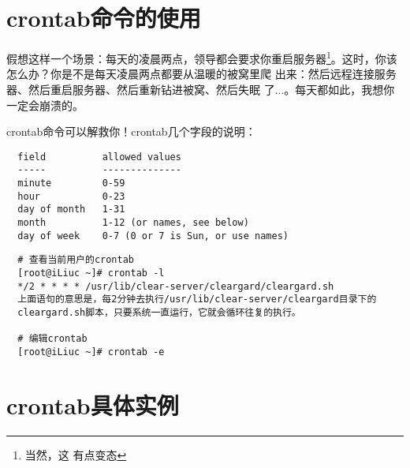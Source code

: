 \section{crontab命令的使用}
\label{sec:crontabCmd}

假想这样一个场景：每天的凌晨两点，领导都会要求你重启服务器\footnote{当然，这
有点变态}。这时，你该怎么办？你是不是每天凌晨两点都要从温暖的被窝里爬
出来：然后远程连接服务器、然后重启服务器、然后重新钻进被窝、然后失眠
了...。每天都如此，我想你一定会崩溃的。

crontab命令可以解救你！crontab几个字段的说明：

\small{
\begin{verbatim}
  field          allowed values
  -----          --------------
  minute         0-59
  hour           0-23
  day of month   1-31
  month          1-12 (or names, see below)
  day of week    0-7 (0 or 7 is Sun, or use names)
\end{verbatim}
}
\normalsize

\small{
\begin{verbatim}
  # 查看当前用户的crontab
  [root@iLiuc ~]# crontab -l
  */2 * * * * /usr/lib/clear-server/cleargard/cleargard.sh
  上面语句的意思是，每2分钟去执行/usr/lib/clear-server/cleargard目录下的
  cleargard.sh脚本，只要系统一直运行，它就会循环往复的执行。

  # 编辑crontab
  [root@iLiuc ~]# crontab -e
\end{verbatim}
}
\normalsize

\section{crontab具体实例}
\label{sec:crontabExamples}
